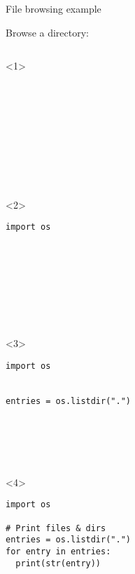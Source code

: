 \begin{frame}[fragile]{File browsing example}

  Browse a directory:

  \begin{columns}[onlytextwidth]
    \begin{column}{\textwidth}

      \begin{onlyenv}<1>
        \begin{lstlisting}[style=python,basicstyle=\ttfamily\footnotesize]










 \end{lstlisting}
      \end{onlyenv}

      \begin{onlyenv}<2>
        \begin{lstlisting}[style=python,basicstyle=\ttfamily\footnotesize]
import os









 \end{lstlisting}
      \end{onlyenv}

      \begin{onlyenv}<3>
        \begin{lstlisting}[style=python,basicstyle=\ttfamily\footnotesize]
import os


entries = os.listdir(".")






 \end{lstlisting}
      \end{onlyenv}

      \begin{onlyenv}<4>
        \begin{lstlisting}[style=python,basicstyle=\ttfamily\footnotesize]
import os

# Print files & dirs
entries = os.listdir(".")
for entry in entries:
  print(str(entry))




 \end{lstlisting}
      \end{onlyenv}


\end{column}
\end{columns}
\end{frame}
